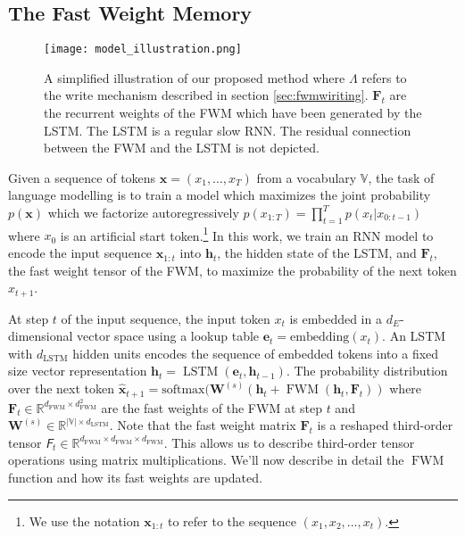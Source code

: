 \documentclass{article} \usepackage{iclr2021_conference,times}
\def\ve{{\bm{e}}}
\def\vh{{\bm{h}}}
\def\vx{{\bm{x}}}
\def\mF{{\bm{F}}}
\def\mW{{\bm{W}}}
\newcommand{\tens}[1]{\bm{\mathsfit{#1}}}
\def\tF{{\tens{F}}}
\def\sV{{\mathbb{V}}}
\newcommand{\softmax}{\mathrm{softmax}}
\newcommand{\embedding}{\mathrm{embedding}}
\DeclareMathOperator{\FWM}{\mathrm{FWM}}
\DeclareMathOperator{\LSTM}{\mathrm{LSTM}}
\begin{document}
\subsection{The Fast Weight Memory}
\begin{wrapfigure}{r}{6cm}
  \vspace{-20pt}
  \centering
  \texttt{[image: model\_illustration.png]}
\caption{A simplified illustration of our proposed method where $\Lambda$ refers to the write mechanism described in section \ref{sec:fwmwiriting}. $\mF_t$ are the recurrent weights of the FWM which have been generated by the LSTM. The LSTM is a regular slow RNN. The residual connection between the FWM and the LSTM is not depicted.}
  \label{fig:illustration}
  \vspace{-0.5cm}
\end{wrapfigure}
Given a sequence of tokens $\mathbf{x} = (x_1, ..., x_T)$ from a vocabulary $\sV$, the task of language modelling is to train a model which maximizes the joint probability $p(\mathbf{x})$ which we factorize autoregressively $p(x_{1:T}) = \prod_{t=1}^T p(x_t|x_{0:t-1})$ where $x_0$ is an artificial start token.\footnote{We use the notation $\mathbf{x}_{1:t}$ to refer to the sequence $(x_1, x_2, ..., x_{t})$.}
In this work, we train an RNN model to encode the input sequence $\mathbf{x}_{1:t}$ into $\vh_t$, the hidden state of the LSTM, and $\mF_t$, the fast weight tensor of the FWM, to maximize the probability of the next token $x_{t+1}$.

At step $t$ of the input sequence, the input token $x_{t}$ is embedded in a $d_E$-dimensional vector space using a lookup table $\ve_{t} = \embedding(x_{t})$. An LSTM with $d_\text{LSTM}$ hidden units encodes the sequence of embedded tokens into a fixed size vector representation $\vh_t = \LSTM(\ve_{t}, \vh_{t-1})$. 
The probability distribution over the next token $\hat{\vx}_{t+1} = \softmax(\mW^{(s)} (\vh_t + \FWM(\vh_t, \mF_t))$ where $\mF_t \in \mathbb{R}^{d_\text{FWM} \times d_\text{FWM}^2}$ are the fast weights of the FWM at step $t$ and  $\mW^{(s)} \in \mathbb{R}^{|\sV| \times d_\text{LSTM}}$.
Note that the fast weight matrix $\mF_t$ is a reshaped third-order tensor $\tF_t \in \mathbb{R}^{d_\text{FWM} \times d_\text{FWM} \times d_\text{FWM}}$. This allows us to describe third-order tensor operations using matrix multiplications.
We'll now describe in detail the $\FWM$ function and how its fast weights are updated.
\end{document}
